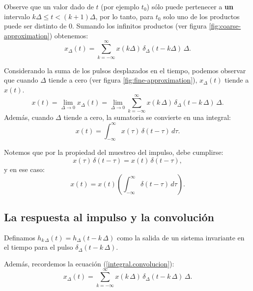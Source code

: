 \documentclass[11pt,a4paper,openany]{book}
\begin{document}
Observe que un valor dado de $t$ (por ejemplo $t_{0}$) sólo puede pertenecer a \textbf{un} intervalo $k\Delta \leq t < (k+1)\Delta$, por lo tanto, para $t_{0}$ solo uno de los productos puede ser distinto de $0$. Sumando los infinitos productos (ver figura \ref{fig:coarse-approximation}) obtenemos:
\begin{equation}
	x_{\Delta}(t) = \sum_{k=-\infty}^{\infty} x(k\Delta) \, \delta_{\Delta}(t-k\Delta) \, \Delta .
\end{equation}

Considerando la suma de los pulsos desplazados en el tiempo, podemos observar que cuando $\Delta$ tiende a cero (ver figura \ref{fig:fine-approximation}), $x_{\Delta}(t)$ tiende a $x(t)$.
\begin{equation}
	x(t) = \lim_{\Delta \to 0} x_{\Delta}(t) = \lim_{\Delta \to 0} \sum_{k=-\infty}^{\infty} x(k \, \Delta) \, \delta_{\Delta}(t-k \, \Delta) \, \Delta .
\end{equation}
Además, cuando $\Delta$ tiende a cero, la sumatoria se convierte en una integral:
\begin{equation}
	x(t) = \int_{-\infty}^{\infty} x(\tau) \, \delta(t-\tau) \, d\tau . \label{integral.convolucion}
\end{equation}

Notemos que por la propiedad del muestreo del impulso, debe cumplirse:
\begin{equation} 
	x(\tau) \, \delta(t-\tau) = x(t) \, \delta(t-\tau),
\end{equation}
y en ese caso:
\begin{equation}
	x(t) = x(t) \left( \int_{-\infty}^{\infty} \delta(t-\tau) \, d\tau \right).
\end{equation}

\subsection{La respuesta al impulso y la convolución}

Definamos $h_{k \, \Delta }(t) = h_{\Delta}\left( t-k \, \Delta \right)$ como la salida de un sistema invariante en el tiempo para el pulso $\delta_{\Delta}(t-k \, \Delta)$. 

Además, recordemos la ecuación (\ref{integral.convolucion}):
\begin{equation}
	x_{\Delta}(t) = \sum_{k=-\infty}^{\infty} x(k \, \Delta) \, \delta_{\Delta}(t-k \, \Delta) \, \Delta .
\end{equation}
\end{document}
